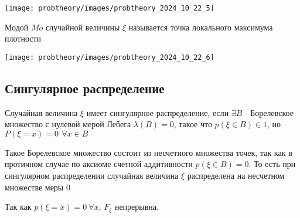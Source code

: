 \documentclass[12pt]{article}
\begin{document}
    \texttt{[image: probtheory/images/probtheory\_2024\_10\_22\_5]}

    \Def Модой $Mo$ случайной величины $\xi$ называется точка локального максимума плотности

    \texttt{[image: probtheory/images/probtheory\_2024\_10\_22\_6]}

    \hypertarget{singulardistribution}{}

    \subsection{Сингулярное распределение}

    \Def Случайная величина $\xi$ имеет сингулярное распределение, если $\exists B$ - Борелевское множество с нулевой мерой Лебега $\lambda(B) = 0$, такое что $p(\xi \in B) \in 1$, но $P(\xi = x) = 0 \ \, \forall x \in B$

    \Nota Такое Борелевское множество состоит из несчетного множества точек, так как в протичном случае по аксиоме счетной аддитивности $p(\xi \in B) = 0$. То есть 
    при сингулярном распределении случайная величина $\xi$ распределена на несчетном множестве меры 0

    \Notas Так как $p(\xi = x) = 0 \  \forall x$, $F_\xi$ непрерывна.

    \smallvspace
    
\end{document}
